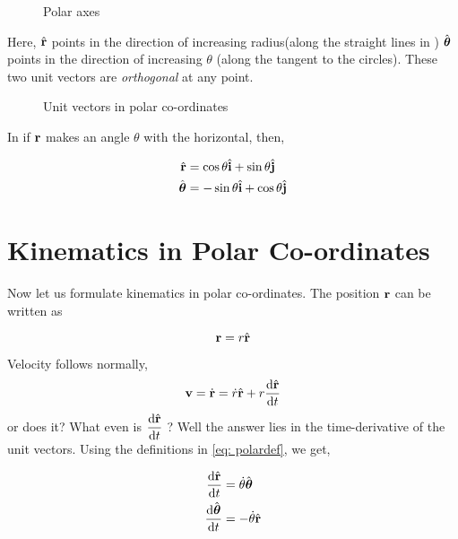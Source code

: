 \begin{figure}
    [H]
    \centering
    \caption{Polar axes}
    \label{fig: polar}
\end{figure}

Here, \({\hat{\boldsymbol{\mathbf{r}}}}\) points in the direction of increasing radius(along the straight lines in )
\({\hat{\boldsymbol{\mathbf{\theta}}}}\) points in the direction of increasing \(\theta\) (along the tangent to the circles).
These two unit vectors are \emph{orthogonal} at any point. 

\begin{figure}
    [H]
    \centering
    \caption{Unit vectors in polar co-ordinates}
    \label{fig: polarunit}
\end{figure}

\noindent In  if \(\boldsymbol{\mathbf{r}}\) makes
an angle \(\theta\) with the horizontal, then,

\begin{align}
    \label{eq: polardef}
    {\hat{\boldsymbol{\mathbf{r}}}} &= \cos \theta {\hat{\boldsymbol{\mathbf{i}}}} + \sin \theta {\hat{\boldsymbol{\mathbf{j}}}}\\
    {\hat{\boldsymbol{\mathbf{\theta}}}} &= -\sin \theta {\hat{\boldsymbol{\mathbf{i}}}} + \cos \theta {\hat{\boldsymbol{\mathbf{j}}}}
\end{align}

\section{Kinematics in Polar Co-ordinates}

Now let us formulate kinematics in polar co-ordinates. The position \(\boldsymbol{\mathbf{r}}\) can be written as

\begin{equation}
    \boldsymbol{\mathbf{r}} = r {\hat{\boldsymbol{\mathbf{r}}}}
\end{equation}

\noindent Velocity follows normally, 
\begin{equation}
    \vect{v} = \ndiv{\vect{r}} = \ndiv{r} \unitv{r} + r\derivative{\unitv{r}}{t} 
\end{equation}
or does it? What even is \(\displaystyle\derivative{\unitv{r}}{t}\) ? Well the answer lies in 
the time-derivative of the unit vectors. Using the definitions in \eqref{eq: polardef}, we get,

\begin{align}
    \derivative{\unitv{r}}{t} &= \ndiv{\theta} \unitv{\theta}\\
    \derivative{\unitv{\theta}}{t} &= -\ndiv{\theta} \unitv{r}
\end{align}

